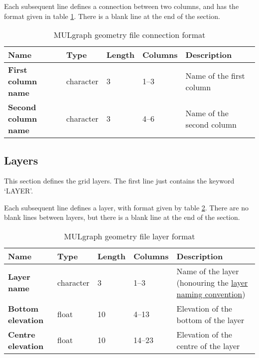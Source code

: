 Each subsequent line defines a connection between two columns, and has the format given in table \ref{tb:mulgraph_format_connection}. There is a blank line at the end of the section.

\begin{table}[h]
  \begin{center}
    \begin{tabular}{|p{20mm}|l|l|l|p{50mm}|}
      \hline
      \textbf{Name} & \textbf{Type} & \textbf{Length} & \textbf{Columns} & \textbf{Description}\\
      \hline
      \textbf{First column name} & character & 3 & 1--3 & Name of the first column\\
      \hline
      \textbf{Second column name} & character & 3 & 4--6 & Name of the second column\\
      \hline
    \end{tabular}
    \caption{MULgraph geometry file connection format}
    \label{tb:mulgraph_format_connection}
  \end{center}
\end{table}

\subsection{Layers}
This section defines the grid layers. The first line just contains the keyword `LAYER'.

Each subsequent line defines a layer, with format given by table \ref{tb:mulgraph_format_layer}. There are no blank lines between layers, but there is a blank line at the end of the section.

\begin{table}[h]
  \begin{center}
    \begin{tabular}{|p{20mm}|l|l|l|p{50mm}|}
      \hline
      \textbf{Name} & \textbf{Type} & \textbf{Length} & \textbf{Columns} & \textbf{Description}\\
      \hline
      \textbf{Layer name} & character & 3 & 1--3 & Name of the layer (honouring the \hyperref[tb:mulgrid_conventions]{layer naming convention})\\
      \hline
      \textbf{Bottom elevation} & float & 10 & 4--13 & Elevation of the bottom of the layer\\
      \hline
      \textbf{Centre elevation} & float & 10 & 14--23 & Elevation of the centre of the layer\\
      \hline
    \end{tabular}
    \caption{MULgraph geometry file layer format}
    \label{tb:mulgraph_format_layer}
  \end{center}
\end{table}

